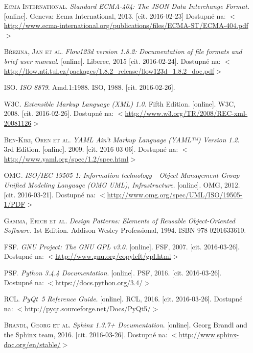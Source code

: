 \documentclass[FM,bw,DP]{tulthesis}
\begin{document}
\begin{thebibliography}{9}


\textsc{Ecma International.} \textit{Standard ECMA-404: The JSON Data Interchange Format.} [online]. Geneva: Ecma International, 2013. [cit. 2016-02-23] Dostupné na: $<$\url{http://www.ecma-international.org/publications/files/ECMA-ST/ECMA-404.pdf}$>$

\textsc{Březina, Jan et al.} \textit{Flow123d version 1.8.2: Documentation of file formats and brief user manual}. [online]. Liberec, 2015 [cit. 2016-02-24]. Dostupné na: $<$\url{http://flow.nti.tul.cz/packages/1.8.2_release/flow123d_1.8.2_doc.pdf}$>$

\textsc{\acrshort{ISO}.} \textit{ISO 8879}. Amd.1:1988. \acrfull{ISO}, 1988. [cit. 2016-02-26]. 

\textsc{\acrshort{W3C}.} \textit{Extensible Markup Language (XML) 1.0}. Fifth Edition. [online]. \acrfull{W3C}, 2008. [cit. 2016-02-26]. Dostupné na: $<$\url{http://www.w3.org/TR/2008/REC-xml-20081126}$>$

\textsc{Ben-Kiki, Oren et al.} \textit{YAML Ain’t Markup Language (YAML™) Version 1.2}. 3rd Edition. [online]. 2009. [cit. 2016-03-06]. Dostupné na: $<$\url{http://www.yaml.org/spec/1.2/spec.html}$>$

\textsc{\acrshort{OMG}.} \textit{ISO/IEC 19505-1: Information technology - Object Management Group
Unified Modeling Language (OMG UML),
Infrastructure}. [online]. \acrfull{OMG}, 2012. [cit. 2016-03-21]. Dostupné na: $<$\url{http://www.omg.org/spec/UML/ISO/19505-1/PDF}$>$

\textsc{Gamma, Erich et al.} \textit{Design Patterns: Elements of Reusable Object-Oriented Software}. 1st Edition. Addison-Wesley Professional, 1994. ISBN 978-0201633610.

\acrshort{FSF}. \textit{\acrshort{GNU} Project: The \acrshort{GNU} \acrlong{GPL} v3.0}. [online]. \acrfull{FSF}, 2007. [cit. 2016-03-26]. Dostupné na: $<$\url{http://www.gnu.org/copyleft/gpl.html}$>$

\acrshort{PSF}. \textit{Python 3.4.4 Documentation}. [online]. \acrfull{PSF}, 2016. [cit. 2016-03-26]. Dostupné na: $<$\url{https://docs.python.org/3.4/}$>$

\textsc{\acrshort{RCL}.} \textit{PyQt~5 Reference Guide}. [online]. \acrfull{RCL}, 2016. [cit. 2016-03-26]. Dostupné na: $<$\url{http://pyqt.sourceforge.net/Docs/PyQt5/}$>$

\textsc{Brandl, Georg et al.} \textit{Sphinx 1.3.7+ Documentation}. [online]. Georg Brandl and the Sphinx team, 2016. [cit. 2016-03-26]. Dostupné na: $<$\url{http://www.sphinx-doc.org/en/stable/}$>$

\end{thebibliography}
\end{document}
